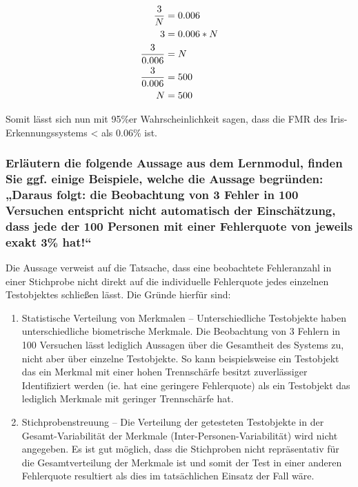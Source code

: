 \documentclass{article}
\begin{document}
\begin{align*}
         {3 \over N} & = 0.006 \\
                   3 & = 0.006 * N \\
     {3 \over 0.006} & = N\\
     {3 \over 0.006} & = 500\\
                   N & = 500
\end{align*}

Somit lässt sich nun mit 95\%er Wahrscheinlichkeit sagen, dass die FMR des Iris-Erkennungssystems < als 0.06\% ist.

\subsubsection{Erläutern die folgende Aussage aus dem Lernmodul, finden Sie ggf. einige Beispiele, welche die Aussage begründen: „Daraus folgt: die Beobachtung von 3 Fehler in 100 Versuchen entspricht nicht automatisch der Einschätzung, dass jede der 100 Personen mit einer Fehlerquote von jeweils exakt 3\% hat!“
}

Die Aussage verweist auf die Tatsache, dass eine beobachtete Fehleranzahl in einer Stichprobe nicht direkt auf die 
individuelle Fehlerquote jedes einzelnen Testobjektes schließen lässt. Die Gründe hierfür sind:
 
\begin{enumerate}
 	\item Statistische Verteilung von Merkmalen – Unterschiedliche Testobjekte haben unterschiedliche biometrische Merkmale. Die Beobachtung von 3 Fehlern in 100 Versuchen lässt lediglich Aussagen über die Gesamtheit des Systems zu, nicht aber über einzelne Testobjekte. So kann beispielsweise ein Testobjekt das ein Merkmal mit einer hohen Trennschärfe besitzt zuverlässiger Identifiziert werden (ie. hat eine geringere Fehlerquote) als ein Testobjekt das lediglich Merkmale mit geringer Trennschärfe hat.
 	\item Stichprobenstreuung – Die Verteilung der getesteten Testobjekte in der Gesamt-Variabilität der Merkmale (Inter-Personen-Variabilität) wird nicht angegeben. Es ist gut möglich, dass die Stichproben nicht repräsentativ für die Gesamtverteilung der Merkmale ist und somit der Test in einer anderen Fehlerquote resultiert als dies im tatsächlichen Einsatz der Fall wäre.
\end{enumerate}
 
\newpage
 
\section{}
\end{document}
